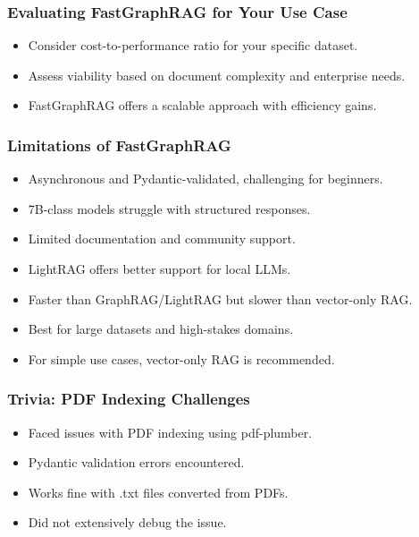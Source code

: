 \begin{frame}[fragile]\frametitle{Evaluating FastGraphRAG for Your Use Case}
    \begin{itemize}
        \item Consider cost-to-performance ratio for your specific dataset.
        \item Assess viability based on document complexity and enterprise needs.
        \item FastGraphRAG offers a scalable approach with efficiency gains.
    \end{itemize}
\end{frame}

\begin{frame}[fragile]\frametitle{Limitations of FastGraphRAG}
    \begin{itemize}
        \item Asynchronous and Pydantic-validated, challenging for beginners.
        \item 7B-class models struggle with structured responses.
        \item Limited documentation and community support.
        \item LightRAG offers better support for local LLMs.
        \item Faster than GraphRAG/LightRAG but slower than vector-only RAG.
        \item Best for large datasets and high-stakes domains.
        \item For simple use cases, vector-only RAG is recommended.
    \end{itemize}
\end{frame}

\begin{frame}[fragile]\frametitle{Trivia: PDF Indexing Challenges}
    \begin{itemize}
        \item Faced issues with PDF indexing using pdf-plumber.
        \item Pydantic validation errors encountered.
        \item Works fine with .txt files converted from PDFs.
        \item Did not extensively debug the issue.
    \end{itemize}
\end{frame}

